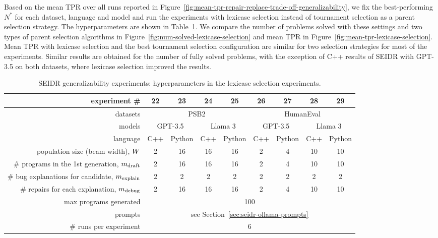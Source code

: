 Based on the mean TPR over all runs reported in Figure~\ref{fig:mean-tpr-repair-replace-trade-off-generalizability}, we fix the best-performing $N^*$ for each dataset, language and model and run the experiments with lexicase selection instead of tournament selection as a parent selection strategy. 
The hyperparameters are shown in Table~\ref{tab:lexicase-selection-hyperparameters}.
We compare the number of problems solved with these settings and two types of parent selection algorithms in Figure~\ref{fig:num-solved-lexicase-selection} and mean TPR in Figure~\ref{fig:mean-tpr-lexicase-selection}.
Mean TPR with lexicase selection and the best tournament selection configuration are similar for two selection strategies for most of the experiments.
Similar results are obtained for the number of fully solved problems, with the exception of C++ results of SEIDR with GPT-3.5 on both datasets, where lexicase selection improved the results.

\begin{table}[t]
\setlength{\tabcolsep}{4pt}
\centering
\caption{SEIDR generalizability experiments: hyperparameters in the lexicase selection experiments.}\small
\label{tab:lexicase-selection-hyperparameters}
\begin{tabular}{rcccc|cccc}
\toprule
experiment \# & 22 & 23 & 24 & 25 & 26 & 27 & 28 & 29 \\
\midrule
datasets  & \multicolumn{4}{c|}{PSB2} & \multicolumn{4}{c}{HumanEval}  \\ 
\midrule
models  & 
\multicolumn{2}{c|}{GPT-3.5} &
\multicolumn{2}{c|}{Llama 3} &
\multicolumn{2}{c|}{GPT-3.5} &
\multicolumn{2}{c}{Llama 3}\\ 
\midrule
language  & C++ & Python & C++ & \multicolumn{1}{c|}{Python} & C++ & Python & C++ & Python \\
\midrule
population size (beam width), $W{}$ & 2 & 16 & 16 & 16 & 2 & 4 & 10 & 10  \\
\# programs in the 1st generation, $m_\text{draft}$ & 2 & 16 & 16 & 16 & 2 & 4 & 10 & 10  \\
\# bug explanations for candidate, $m_\text{explain}$ & 2 & 2 & 2 & 2 & 2 & 2 & 2 & 2 \\
\# repairs for each explanation, $m_\text{debug}$ & 2 & 16 & 16 & 16 & 2 & 4 & 10 & 10 \\
\midrule
max programs generated & \multicolumn{8}{c}{100} \\
prompts & \multicolumn{8}{c}{see Section~\ref{sec:seidr-ollama-prompts}} \\
\# runs per experiment &  \multicolumn{8}{c}{6} \\
\bottomrule
\end{tabular}
\end{table}



